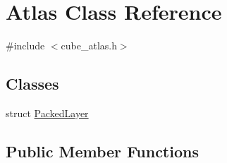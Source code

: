 \hypertarget{class_atlas}{\section{Atlas Class Reference}
\label{class_atlas}
}


{\ttfamily \#include $<$cube\+\_\+atlas.\+h$>$}

\subsection*{Classes}
\begin{DoxyCompactItemize}
\item 
struct \hyperlink{struct_atlas_1_1_packed_layer}{Packed\+Layer}
\end{DoxyCompactItemize}
\subsection*{Public Member Functions}
